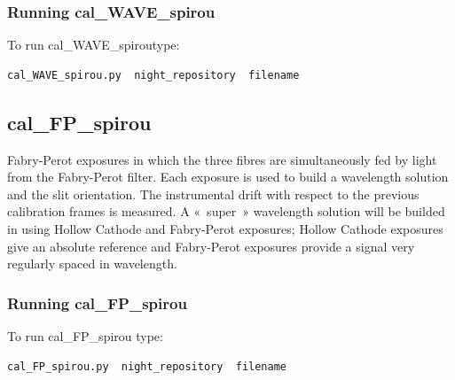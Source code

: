 \subsubsection{Running cal\_WAVE\_spirou}

To run cal\_WAVE\_spiroutype:
\begin{lstlisting}[language=bash, style=bashstyle]
cal_WAVE_spirou.py  night_repository  filename
\end{lstlisting}



\subsection{cal\_FP\_spirou}

Fabry-Perot exposures in which the three fibres are simultaneously fed by light from the Fabry-Perot filter. Each exposure is used to build a wavelength solution and the slit orientation. The instrumental drift with respect to the previous calibration frames is measured. A « super » wavelength solution will be builded in using Hollow Cathode and Fabry-Perot exposures; Hollow Cathode exposures give an absolute reference and Fabry-Perot exposures provide a signal very regularly spaced  in wavelength.

\subsubsection{Running cal\_FP\_spirou}

To run cal\_FP\_spirou type:
\begin{lstlisting}[language=bash, style=bashstyle]
cal_FP_spirou.py  night_repository  filename
\end{lstlisting}
